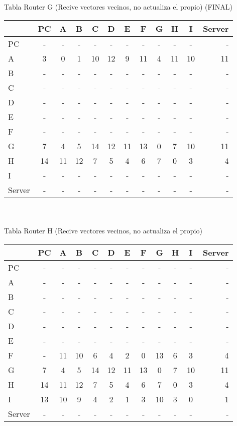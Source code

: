 \documentclass{article}
\begin{document}
\\
\\
Tabla Router G (Recive vectores vecinos, no actualiza el propio) (FINAL) \\
\begin{tabular}{l*{10}{c}r}
              & PC & A & B & C & D & E & F & G & H & I & Server \\
\hline
PC             & - & - & - & - & - & - & - & - & - & - & -\\
A              & 3 & 0 & 1 & 10 & 12 & 9 & 11 & 4 & 11 & 10 & 11 \\
B              & - & - & - & - & - & - & - & - & - & - & -\\
C              & - & - & - & - & - & - & - & - & - & - & -\\
D              & - & - & - & - & - & - & - & - & - & - & -\\
E              & - & - & - & - & - & - & - & - & - & - & -\\
F              & - & - & - & - & - & - & - & - & - & - & -\\
G              & 7 & 4 & 5 & 14 & 12 & 11 & 13 & 0 & 7 & 10 & 11\\
H              & 14 & 11 & 12 & 7 & 5 & 4 & 6 & 7 & 0 & 3 & 4\\
I              & - & - & - & - & - & - & - & - & - & - & -\\
Server         & - & - & - & - & - & - & - & - & - & - & -\\

\end{tabular}
\\
\\
Tabla Router H (Recive vectores vecinos, no actualiza el propio) \\
\begin{tabular}{l*{10}{c}r}
              & PC & A & B & C & D & E & F & G & H & I & Server \\
\hline
PC             & - & - & - & - & - & - & - & - & - & - & - \\
A              & - & - & - & - & - & - & - & - & - & - & - \\
B              & - & - & - & - & - & - & - & - & - & - & - \\
C              & - & - & - & - & - & - & - & - & - & - & - \\
D              & - & - & - & - & - & - & - & - & - & - & - \\
E              & - & - & - & - & - & - & - & - & - & - & - \\
F              & - & 11 & 10 & 6 & 4 & 2 & 0 & 13 & 6 & 3 & 4\\
G              & 7 & 4 & 5 & 14 & 12 & 11 & 13 & 0 & 7 & 10 & 11\\
H              & 14 & 11 & 12 & 7 & 5 & 4 & 6 & 7 & 0 & 3 & 4\\
I              & 13 & 10 & 9 & 4 & 2 & 1 & 3 & 10 & 3 & 0 & 1\\
Server         & - & - & - & - & - & - & - & - & - & - & - \\

\end{tabular}
\end{document}

